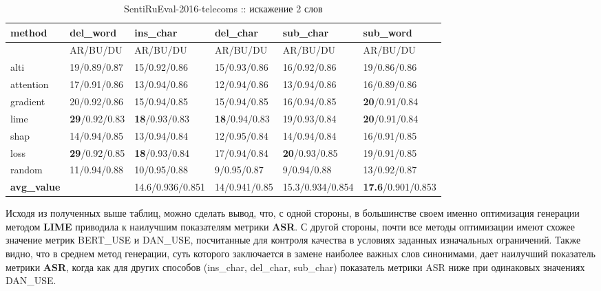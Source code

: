 \begin{table}[H]
  \centering
  \caption{SentiRuEval-2016-telecoms :: искажение 2 слов}
  {\renewcommand{\arraystretch}{1.5}
  {\fontsize{9pt}{10pt}\selectfont
  \begin{tabularx}{\textwidth}{|l|X|X|X|X|X|}
    \hline
     method    & del\_word  &        ins\_char         & del\_char         & sub\_char         & sub\_word   \\
    \hline
     & AR/BU/DU & AR/BU/DU  & AR/BU/DU  & AR/BU/DU  & AR/BU/DU \\
    \hline
     alti      & 19/0.89/0.87 & 15/0.92/0.86 & 15/0.93/0.86 & 16/0.92/0.86 & 19/0.86/0.86 \\
    \hline
     attention & 17/0.91/0.86 & 13/0.94/0.86 & 12/0.94/0.86 & 13/0.94/0.86 & 16/0.89/0.86 \\
    \hline
     gradient  & 20/0.92/0.86 & 15/0.94/0.85 & 15/0.94/0.85 & 16/0.94/0.85 & \textbf{20}/0.91/0.84 \\
    \hline
     lime      & \textbf{29}/0.92/0.83 & \textbf{18}/0.93/0.83 & \textbf{18}/0.94/0.83 & 19/0.93/0.84 & \textbf{20}/0.91/0.84 \\
    \hline
     shap      & 14/0.94/0.85 & 13/0.94/0.84 & 12/0.95/0.84 & 14/0.94/0.84 & 16/0.91/0.85 \\
    \hline
     loss      & \textbf{29}/0.92/0.85 & \textbf{18}/0.93/0.84 & 17/0.94/0.84 & \textbf{20}/0.93/0.85 & 19/0.91/0.85 \\
    \hline
     random    & 11/0.94/0.88 & 10/0.95/0.88   & 9/0.95/0.87   & 9/0.94/0.88  & 13/0.92/0.87 \\
    \hline
     \textbf{avg\_value} & \cellcolor{gray!25} & 14.6/0.936/0.851 & 14/0.941/0.85 & 15.3/0.934/0.854 & \textbf{17.6}/0.901/0.853 \\
    \hline
    \end{tabularx}
    }
    }
\end{table}

\noindent\hspace{0.6cm}Исходя из полученных выше таблиц, можно сделать вывод, что, с одной стороны, в большинстве своем именно оптимизация генерации методом \textbf{LIME} приводила к наилучшим показателям метрики \textbf{ASR}. С другой стороны, почти все методы оптимизации имеют схожее значение метрик BERT\_USE и DAN\_USE, посчитанные для контроля качества в условиях заданных изначальных ограничений. Также видно, что в среднем метод генерации, суть которого заключается в замене наиболее важных слов синонимами, дает наилучший показатель метрики \textbf{ASR}, когда как для других способов (ins\_char, del\_char, sub\_char) показатель метрики ASR ниже при одинаковых значениях DAN\_USE.

